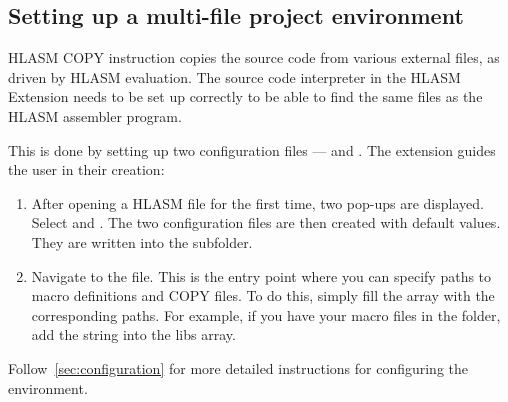 \subsection{Setting up a multi-file project environment}
HLASM COPY instruction copies the source code from various external files, as driven by HLASM evaluation. The source code interpreter in the HLASM Extension needs to be set up correctly to be able to find the same files as the HLASM assembler program. 

This is done by setting up two configuration files ---  and . The extension guides the user in their creation:
\begin{enumerate}
	\item After opening a HLASM file for the first time, two pop-ups are displayed. Select  and . The two configuration files are then created with default values. They are written into the  subfolder.
	\item Navigate to the  file. This is the entry point where you can specify paths to macro definitions and COPY files. To do this, simply fill the  array with the corresponding paths. For example, if you have your macro files in the  folder, add the string  into the libs array.
\end{enumerate}

Follow~\cref{sec:configuration} for more detailed instructions for configuring the environment.
